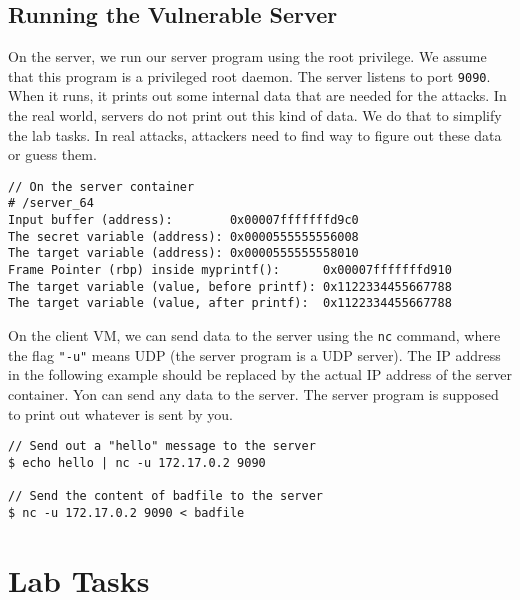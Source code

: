 \subsection{Running the Vulnerable Server} 

On the server, we run our server program using the root privilege. We
assume that this program is a privileged root daemon. The server listens to
port \texttt{9090}. When it runs,  it prints out some internal data 
that are needed for the attacks. In the real world, servers do not 
print out this kind of data. We do that to simplify the lab tasks. 
In real attacks, attackers need to find way to figure out these data
or guess them. 

\begin{lstlisting}
// On the server container
# /server_64
Input buffer (address):        0x00007fffffffd9c0
The secret variable (address): 0x0000555555556008
The target variable (address): 0x0000555555558010
Frame Pointer (rbp) inside myprintf():      0x00007fffffffd910
The target variable (value, before printf): 0x1122334455667788
The target variable (value, after printf):  0x1122334455667788
\end{lstlisting}


On the client VM, we can send data to the server using 
the \texttt{nc} command, where the flag \texttt{"-u"} means UDP (the server
program is a UDP server). The IP address in the following example should be 
replaced by the actual IP address of the server container. 
Yon can send any data to the server. The server program is supposed
to print out whatever is sent by you. 


\begin{lstlisting}
// Send out a "hello" message to the server
$ echo hello | nc -u 172.17.0.2 9090 

// Send the content of badfile to the server
$ nc -u 172.17.0.2 9090 < badfile
\end{lstlisting}


 




\section{Lab Tasks}


